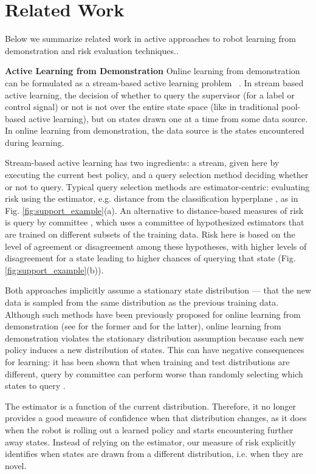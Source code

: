 \documentclass[10pt, conference]{ieeeconf}      %
\begin{document}
\section{Related Work}
Below we summarize related work in active approaches to robot learning from demonstration and risk evaluation techniques.. 

\noindent\textbf{Active Learning from Demonstration}
Online learning from demonstration can be formulated as a stream-based active learning problem ~\cite{atlas1990training,cohn1994improving}. In stream based active learning, the decision of whether to query the supervisor (for a label or control signal) or not is not over the entire state space (like in traditional pool-based active learning), but on states drawn one at a time from some data source. In  online learning  from demonstration, the data source is the states encountered during learning. 

Stream-based active learning has two ingredients: a stream, given here by executing the current best policy, and a query selection method deciding whether or not to query. Typical query selection methods are estimator-centric:  evaluating risk using the estimator, e.g. distance from the classification hyperplane \cite{tong2002support}, as in Fig. \ref{fig:support_example}(a). An alternative to distance-based measures of  risk is query by committee  \cite{breiman1996bagging}, which uses a committee of hypothesized estimators that are trained on different subsets of the training data. Risk here is based on the level of agreement or disagreement among these hypotheses, with higher levels of disagreement for a state leading to higher chances of querying that state (Fig. \ref{fig:support_example}(b)).

Both approaches implicitly assume a stationary state distribution --- that the new data is sampled from the same distribution as the previous training data. Although such methods have been previously proposed for online learning from demonstration (see \cite{chernova2009interactive,grollman2007dogged} for the former and \cite{judah2011active,judah2012active} for the latter),
online learning from demonstration violates the stationary distribution assumption because each new policy induces a new distribution of states. This can have negative consequences for learning: it has been shown that when training and test distributions are different, query by committee can perform worse than randomly selecting  which states to query \cite{burbidge2007active}.

The  estimator is a function of the current distribution. Therefore, it no longer provides a good measure of confidence when that distribution changes, as it does when the robot is rolling out a learned policy and starts encountering further away states. Instead of relying on the estimator, our measure of risk explicitly identifies when states are drawn from a different distribution, i.e. when they are novel. 
\end{document}

